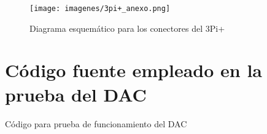 \begin{figure}[H]
    \centering
    \texttt{[image: imagenes/3pi+\_anexo.png]}
    \caption{Diagrama esquemático para los conectores del 3Pi+}
    \label{fig:3pi+_anexo}
\end{figure}

\section{Código fuente empleado en la prueba del DAC}

\label{sec:codigo_dac}


\begin{table}[H]
    \caption{Código para prueba de funcionamiento del DAC}
\end{table}
